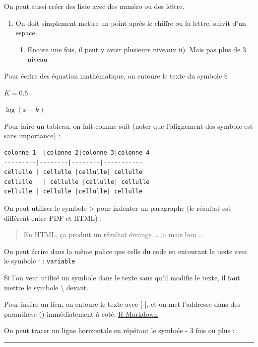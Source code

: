\documentclass[12pt,]{book}
\providecommand{\tightlist}{%
  \setlength{\itemsep}{0pt}\setlength{\parskip}{0pt}}
\begin{document}
On peut aussi créer des liste avec des numéro ou des lettre.

\begin{enumerate}
\def\labelenumi{\arabic{enumi}.}
\tightlist
\item
  On doit simplement mettre un point après le chiffre ou la lettre, suivit d'un espace

  \begin{enumerate}
  \def\labelenumii{\alph{enumii}.}
  \tightlist
  \item
    Encore une fois, il peut y avoir plusieurs niveaux
    ii). Mais pas plus de 3 niveau
  \end{enumerate}
\end{enumerate}

Pour écrire des équation mathématique, on entoure le texte du symbole \$

\(K = 0.5\)

\(\log(x + k)\)

Pour faire un tableau, on fait comme suit (noter que l'alignement des symbole est sans importance) :

\begin{verbatim}
colonne 1  |colonne 2|colonne 3|colonne 4
---------|--------|--------|-----------
cellulle | cellulle |cellulle| cellulle
cellulle   | cellulle |cellulle| cellulle
cellulle | cellulle |cellulle| cellulle
\end{verbatim}

On peut utiliser le symbole \textgreater{} pour indenter un paragraphe (le résultat est différent entre PDF et HTML) :

\begin{quote}
En HTML, ça produit un résultat étrange \ldots{}
\textgreater{} mais bon \ldots{}
\end{quote}

On peut écrire dans la même police que celle du code en entourant le texte avec le symbole ` :
\texttt{variable}

Si l'on veut utilisé un symbole dans le texte sans qu'il modifie le texte, il faut mettre le symbole \textbackslash{} devant.

Pour inséré un lien, on entoure le texte avec {[} {]}, et on met l'addresse dans des paranthèse () immédiatement à coté:
\href{http://rmarkdown.rstudio.com}{R Markdown}

On peut tracer un ligne horizontale en répétant le symbole - 3 fois ou plus :

\begin{center}\rule{0.5\linewidth}{0.5pt}\end{center}
\end{document}

